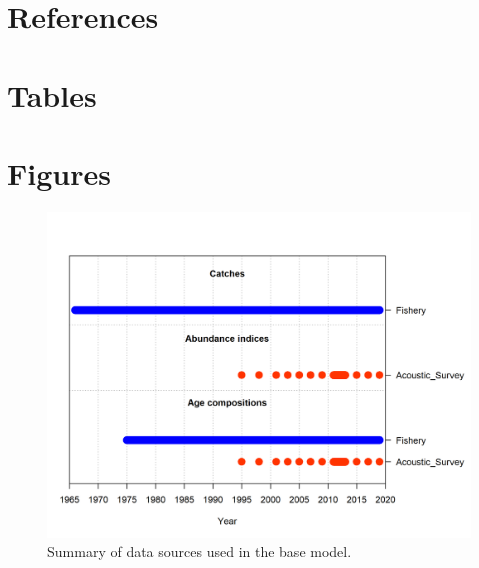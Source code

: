 \documentclass[11pt,
  english,
  a4paper,
]{article}
\begin{document}

\hypertarget{references}{%
\section{References}\label{references}}

\leavevmode\tagmcend\tagstructend


\hypertarget{refs}{}

\leavevmode\tagmcend\tagstructend

\clearpage


\hypertarget{tables}{%
\section{Tables}\label{tables}}

\leavevmode\tagmcend\tagstructend

\clearpage


\hypertarget{figures}{%
\section{Figures}\label{figures}}

\leavevmode\tagmcend\tagstructend


\begin{figure}
\centering
\includegraphics[width=1\textwidth,height=1\textheight]{data-plot.png}
\caption{Summary of data sources used in the base model.\label{fig:data-plot}}
\end{figure}

\tagmcend\tagstructend
\end{document}
